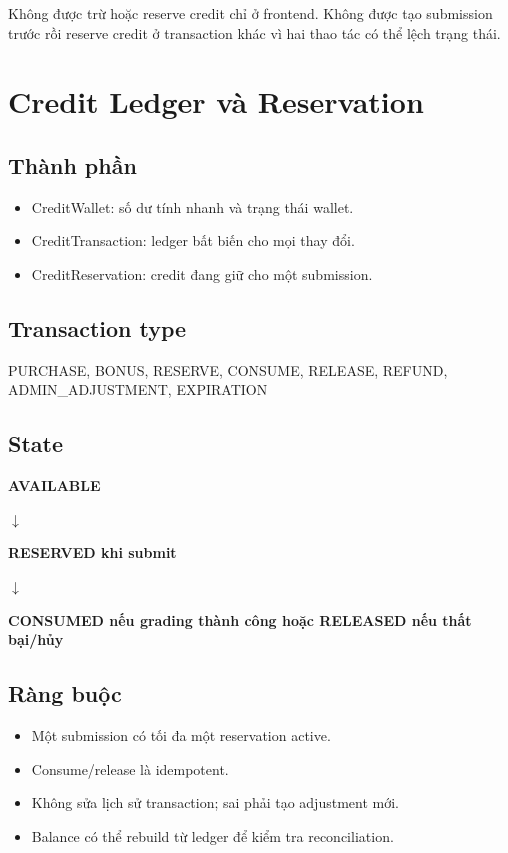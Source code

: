 \documentclass[11pt,a4paper]{article}
\newcommand{\flowarrow}{\par\centering\sffamily\color{BandBlue}\Large$\downarrow$\par}
\newcommand{\flowstep}[1]{\par\centering\sffamily\bfseries #1\par}
\begin{document}
\begin{warningbox}
Không được trừ hoặc reserve credit chỉ ở frontend. Không được tạo submission trước rồi reserve credit ở transaction khác vì hai thao tác có thể lệch trạng thái.
\end{warningbox}

\section{Credit Ledger và Reservation}

\subsection{Thành phần}
\begin{itemize}
  \item CreditWallet: số dư tính nhanh và trạng thái wallet.
  \item CreditTransaction: ledger bất biến cho mọi thay đổi.
  \item CreditReservation: credit đang giữ cho một submission.
\end{itemize}

\subsection{Transaction type}
\begin{codebox}
PURCHASE, BONUS, RESERVE, CONSUME, RELEASE, REFUND, ADMIN\_ADJUSTMENT, EXPIRATION
\end{codebox}

\subsection{State}
\begin{flowbox}
\flowstep{AVAILABLE}
\flowarrow
\flowstep{RESERVED khi submit}
\flowarrow
\flowstep{CONSUMED nếu grading thành công hoặc RELEASED nếu thất bại/hủy}
\end{flowbox}

\subsection{Ràng buộc}
\begin{itemize}
  \item Một submission có tối đa một reservation active.
  \item Consume/release là idempotent.
  \item Không sửa lịch sử transaction; sai phải tạo adjustment mới.
  \item Balance có thể rebuild từ ledger để kiểm tra reconciliation.
\end{itemize}
\end{document}
